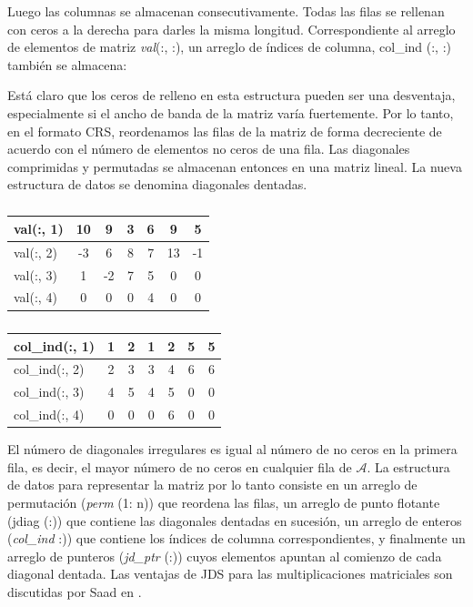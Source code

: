 \documentclass[a4paper,openright,12pt, oneside]{book}
\begin{document}
Luego las columnas se almacenan consecutivamente. Todas las filas se rellenan con ceros a la derecha para darles la misma longitud. Correspondiente al arreglo de elementos de matriz \textit{val}(:, :), un arreglo de \'indices de columna, col\_ind (:, :) tambi\'en se almacena:

Est\'a claro que los ceros de relleno en esta estructura pueden ser una desventaja, especialmente si el ancho de banda de la matriz var\'ia fuertemente. Por lo tanto, en el formato CRS, reordenamos las filas de la matriz de forma decreciente de acuerdo con el n\'umero de elementos no ceros de una fila. Las diagonales comprimidas y permutadas se almacenan entonces en una matriz lineal. La nueva estructura de datos se denomina diagonales dentadas.



\begin{table}[htdp]
    \caption{}
    \begin{tabular}{ | l || c | c | c | c | c | c |}
      \hline
      val(:, 1) & 10 & 9 & 3 & 6 & 9 & 5 \\ \hline 
      val(:, 2) & -3 & 6 & 8 & 7 & 13 & -1 \\ \hline
      val(:, 3) & 1 & -2 & 7 & 5 & 0 & 0 \\ \hline
      val(:, 4) & 0 & 0 & 0 & 4 & 0 & 0 \\ \hline 
    \end{tabular}
\end{table}

\begin{table}[htdp]
    \caption{}
    \begin{tabular}{| l || c | c | c | c | c | c |}
        \hline
      col\_ind(:, 1) & 1 & 2 & 1 & 2 & 5 & 5 \\ \hline
      col\_ind(:, 2) & 2 & 3 & 3 & 4 & 6 & 6 \\ \hline
      col\_ind(:, 3) & 4 & 5 & 4 & 5 & 0 & 0 \\ \hline
      col\_ind(:, 4) & 0 & 0 & 0 & 6 & 0 & 0 \\ \hline
    \end{tabular}
\end{table}


El n\'umero de diagonales irregulares es igual al n\'umero de no ceros en la primera fila, es decir, el mayor n\'umero de no ceros en cualquier fila de $\mathcal{A}$. La estructura de datos para representar la matriz por lo tanto consiste en un arreglo de permutaci\'on (\textit{perm} (1: n)) que reordena las filas, un arreglo de punto flotante (jdiag (:)) que contiene las diagonales dentadas en sucesi\'on, un arreglo de enteros (\textit{col\_ind} :)) que contiene los \'indices de columna correspondientes, y finalmente un arreglo de punteros (\textit{jd\_ptr} (:)) cuyos elementos apuntan al comienzo de cada diagonal dentada. Las ventajas de JDS para las multiplicaciones matriciales son discutidas por Saad en \cite{JDS}.
\end{document}
